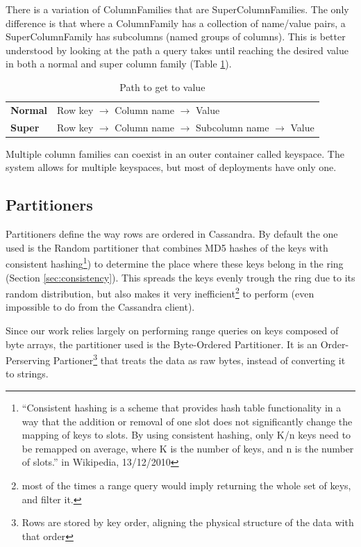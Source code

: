 There is a variation of ColumnFamilies that are SuperColumnFamilies. The only difference is that where a ColumnFamily has a collection of name/value pairs, a SuperColumnFamily has subcolumns (named groups of columns). This is better understood by looking at the path a query takes until reaching the desired value in both a normal and super column family (Table \ref{tab:path}).

\begin{table}[h!]
\centering
  \begin{tabular}{ l | l }
	\hline \hline
	\textbf{Normal} & Row key $\rightarrow$ Column name $\rightarrow$ Value\\
    \textbf{Super}  & Row key $\rightarrow$ Column name $\rightarrow$ Subcolumn name $\rightarrow$ Value\\
    \hline \hline
  \end{tabular}

\caption{Path to get to value}
\label{tab:path}
\end{table}

Multiple column families can coexist in an outer container called keyspace. The system allows for multiple keyspaces, but most of deployments have only one.

\subsection{Partitioners}
\label{sec:partitioners}

Partitioners define the way rows are ordered in Cassandra. By default the one used is the Random partitioner that combines MD5 hashes of the keys with consistent hashing\footnote{``Consistent hashing is a scheme that provides hash table functionality in a way that the addition or removal of one slot does not significantly change the mapping of keys to slots. By using consistent hashing, only K/n keys need to be remapped on average, where K is the number of keys, and n is the number of slots.'' in Wikipedia, 13/12/2010}) to determine the place where these keys belong in the ring (Section \ref{sec:consistency}). This spreads the keys evenly trough the ring due to its random distribution, but also makes it very inefficient\footnote{most of the times a range query would imply returning the whole set of keys, and filter it.} to perform (even impossible to do from the Cassandra client). 

Since our work relies largely on performing range queries on keys composed of byte arrays, the partitioner used is the Byte-Ordered Partitioner. It is an Order-Perserving Partioner\footnote{Rows are stored by key order, aligning the physical structure of the data with that order} that treats the data as raw bytes, instead of converting it to strings.    


